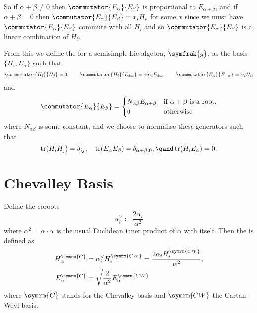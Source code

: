 \documentclass[fleqn]{NotesClass}
\renewcommand{\lie}[1]{\symfrak{#1}}
\DeclareMathOperator{\tr}{tr}
\begin{document}
    So if \(\alpha + \beta \ne 0\) then \(\commutator{E_\alpha}{E_\beta}\) is proportional to \(E_{\alpha + \beta}\), and if \(\alpha + \beta = 0\) then \(\commutator{E_\alpha}{E_\beta} = x_i H_i\) for some \(x\) since we must have \(\commutator{E_\alpha}{E_\beta}\) commute with all \(H_i\) and so \(\commutator{E_\alpha}{E_\beta}\) is a linear combination of \(H_i\).
    
    From this we define the  for a semisimple Lie algebra, \(\lie{g}\), as the basis \(\{H_i, E_\alpha\}\) such that
    \begin{align}
        \commutator{H_i}{H_j} = 0, \qquad \commutator{H_i}{E_{\pm\alpha}} = \pm \alpha_i E_{\pm \alpha}, \qquad \commutator{E_\alpha}{E_{-\alpha}} = \alpha_i H_i,
    \end{align}
    and
    \begin{equation}
        \commutator{E_\alpha}{E_\beta} = 
        \begin{cases}
            N_{\alpha\beta} E_{\alpha + \beta} & \text{if } \alpha + \beta \text{ is a root},\\
            0 & \text{otherwise},
        \end{cases}
    \end{equation}
    where \(N_{\alpha\beta}\) is some constant, and we choose to normalise these generators such that
    \begin{equation}
        \tr(H_i H_j) = \delta_{ij}, \quad \tr(E_\alpha E_\beta) = \delta_{\alpha + \beta, 0}, \qand \tr(H_i E_\alpha) = 0.
    \end{equation}
    
    \section{Chevalley Basis}
    Define the coroots
    \begin{equation}
        \alpha_i^{\vee} \coloneqq \frac{2\alpha_i}{\alpha^2}
    \end{equation}
    where \(\alpha^2 = \alpha \cdot \alpha\) is the usual Euclidean inner product of \(\alpha\) with itself.
    Then the  is defined as
    \begin{align}
        H_\alpha^{\symrm{C}} &= \alpha_i^{\vee} H_i^{\symrm{CW}} = \frac{2\alpha_i H_i^{\symrm{CW}}}{\alpha^2},\\
        E_\alpha^{\symrm{C}} &= \sqrt{\frac{2}{\alpha^2}} E_\alpha^{\symrm{CW}}
    \end{align}
    where \(\symrm{C}\) stands for the Chevalley basis and \(\symrm{CW}\) the Cartan--Weyl basis.
    
\end{document}
